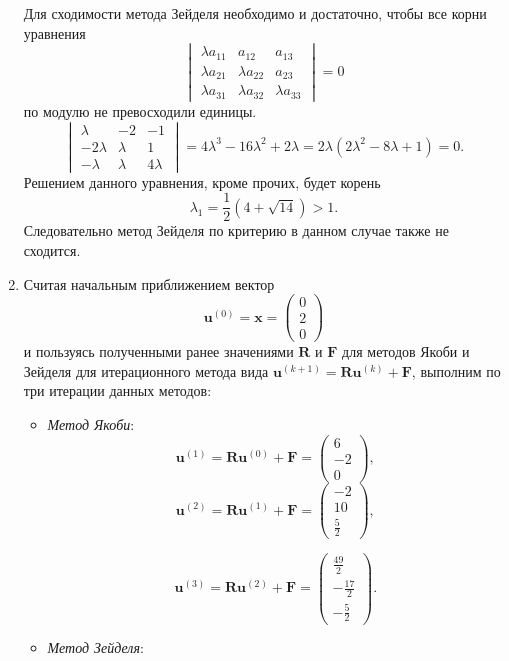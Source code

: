 \documentclass[a4paper]{article}
\begin{document}
\begin{enumerate}
Для сходимости метода Зейделя необходимо и достаточно, чтобы
все корни уравнения
 \[
	 \begin{vmatrix} \lambda a_{11} & a_{12} & a_{13} \\
	 \lambda a_{21} & \lambda a_{22} & a_{23} \\
 \lambda a_{31} & \lambda a_{32} & \lambda a_{33}\end{vmatrix}=0 
\]
по модулю не превосходили единицы.
\[
\begin{vmatrix} 
 \lambda  & -2 & -1 \\
 -2 \lambda  & \lambda  & 1 \\
 -\lambda  & \lambda  & 4 \lambda  
\end{vmatrix} =
4 \lambda ^3-16 \lambda ^2+2 \lambda=
2 \lambda  \left(2 \lambda ^2-8 \lambda +1\right)=0
.\] 
Решением данного уравнения, кроме прочих, будет корень \[\lambda_1=
\frac{1}{2}\left(4 +\sqrt{14}\right)>1. \]
Следовательно метод Зейделя по критерию в данном случае также не сходится.
\item Считая начальным приближением вектор
\[
	\mathbf{u}^{(0)}=\mathbf{x}=\begin{pmatrix} 0 \\ 2\\0 \end{pmatrix} 
\] 
и пользуясь полученными ранее значениями $\mathbf{R}$ и $\mathbf{F}$ 
для методов Якоби и Зейделя для итерационного метода вида
$\mathbf{u}^{(k+1)}= \mathbf{R} \mathbf{u}^{(k)}+\mathbf{F}$,
выполним по три итерации данных методов:
\begin{itemize}
	\item \emph{Метод Якоби}:
\[
	\mathbf{u}^{(1)}=\mathbf{R}\mathbf{u}^{(0)}+\mathbf{F}=
	\begin{pmatrix} 6 \\ -2 \\ 0 \end{pmatrix} 
,\] 
\[
	\mathbf{u}^{(2)}=\mathbf{R}\mathbf{u}^{(1)}+\mathbf{F}=
	\begin{pmatrix} -2 \\ 10 \\ \frac{5}{2} \end{pmatrix} 
,\] 

\[
	\mathbf{u}^{(3)}=\mathbf{R}\mathbf{u}^{(2)}+\mathbf{F}=
	\begin{pmatrix} \frac{49}{2} \\ -\frac{17}{2} \\ -\frac{5}{2} \end{pmatrix} 
.\] 
\item \emph{Метод Зейделя}:


\end{itemize}
\end{enumerate}
\end{document}
